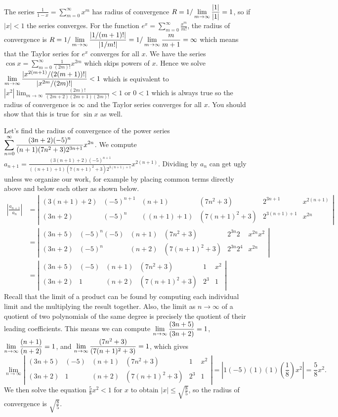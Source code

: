 The series $\frac{1}{1-x}= \sum_{m=0}^\infty x^m$ has radius of convergence $\displaystyle R=1/\lim_{m\to\infty}\frac{|1|}{|1|} = 1$, so if $|x|<1$ the series converges.  For the function $e^x = \sum_{m=0}^\infty \frac{x^m}{m!}$, the radius of convergence is $\displaystyle R=1/\lim_{m\to\infty}\frac{|1/(m+1)!|}{|1/m!|} =1/\lim_{m\to\infty}\frac{m}{m+1} =\infty$ which means that the Taylor series for $e^x$ converges for all $x$. We have the series $\cos x = \sum_{m=0}^\infty \frac{1}{(2m)!} x^{2m}$ which skips powers of $x$.  Hence we solve $\displaystyle \lim_{m\to\infty}\frac{|x^{2(m+1)}/(2(m+1))!|}{| x^{2m}/(2m)!|}<1$ which is equivalent to $|x^2|\lim_{m\to\infty}\frac{(2m)!}{ (2m+2)(2m+1)(2m)!}<1$ or $0<1$ which is always true so the radius of convergence is $\infty$ and the Taylor series converges for all $x$.  You should show that this is true for $\sin x$ as well. 

Let's find the radius of convergence of the power series $\displaystyle\sum_{n=0}^\infty \frac{(3n+2)(-5)^n}{(n+1)(7n^2+3)2^{3n+1}}x^{2n}$.  We compute $a_{n+1} = \frac{(3(n+1)+2)(-5)^{n+1}}{((n+1)+1)(7(n+1)^2+3)2^{3(n+1)+1}}x^{2(n+1)}$.  Dividing by $a_n$ can get ugly unless we organize our work, for example by placing common terms directly above and below each other as shown below.
\begin{align*}
\left|\frac{a_{n+1}}{a_n}\right| 
&=  
\left|\begin{array}{c|c|c|c|c|c}
(3(n+1)+2)&(-5)^{n+1}&(n+1)&(7n^2+3)&2^{3n+1}&x^{2(n+1)}\\\hline
(3n+2)&(-5)^n&((n+1)+1)&(7(n+1)^2+3)&2^{3(n+1)+1}&x^{2n}
\end{array}\right|\\
&=\left|\begin{array}{c|c|c|c|c|c}
(3n+5)&(-5)^{n}(-5)&(n+1)&(7n^2+3)&2^{3n}2&x^{2n}x^2\\\hline
(3n+2)&(-5)^n&(n+2)&(7(n+1)^2+3)&2^{3n}2^{4}&x^{2n}
\end{array}\right|\\
&=\left|\begin{array}{c|c|c|c|c|c}
(3n+5)&(-5)&(n+1)&(7n^2+3)&1&x^2\\\hline
(3n+2)&1&(n+2)&(7(n+1)^2+3)&2^{3}&1
\end{array}\right|
\end{align*}
Recall that the limit of a product can be found by computing each individual limit and the multiplying the result together.  Also, the limit as $n\to \infty$ of a quotient of two polynomials of the same degree is precisely the quotient of their leading coefficients.  This means we can compute 
$\displaystyle\lim_{n\to\infty}\frac{(3n+5)}{(3n+2)} = 1 $, 
$\displaystyle\lim_{n\to\infty}\frac{(n+1)}{(n+2)} = 1 $, and 
$\displaystyle\lim_{n\to\infty}\frac{(7n^2+3)}{(7(n+1)^2+3)} = 1$, which gives 
$$\lim_{n\to\infty}
\left|\begin{array}{c|c|c|c|c|c}
(3n+5)&(-5)&(n+1)&(7n^2+3)&1&x^2\\\hline
(3n+2)&1&(n+2)&(7(n+1)^2+3)&2^{3}&1
\end{array}\right| = \left|1(-5)(1)(1)\left(\frac{1}{8}\right)x^2\right| = \frac{5}{8}x^2.$$ 
We then solve the equation $\frac{5}{8}x^2<1$ for $x$ to obtain $|x|\leq\sqrt{\frac{8}{5}}$, so the radius of convergence is $\sqrt{\frac{8}{5}}$.

